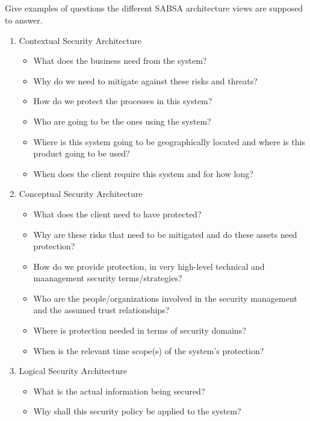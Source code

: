 \begin{questions}
\begin{parts}
  \part{} Give examples of questions the different SABSA architecture views are supposed to answer.
    \begin{solution}
      \begin{enumerate}[noitemsep]
      \item Contextual Security Architecture
        \begin{itemize}[noitemsep]
        \item What does the business need from the system?
        \item Why do we need to mitigate against these risks and threats?
        \item How do we protect the processes in this system?
        \item Who are going to be the ones using the system?
        \item Where is this system going to be geographically located and where is this product going to be used?
        \item When does the client require this system and for how long?
        \end{itemize}
      \item Conceptual Security Architecture
        \begin{itemize}[noitemsep]
        \item What does the client need to have protected?
        \item Why are these risks that need to be mitigated and do these assets need protection?
        \item How do we provide protection, in very high-level technical and maanagement security terms/strategies?
        \item Who are the people/organizations involved in the security management and the assumed trust relationships?
        \item Where is protection needed in terms of security domains?
        \item When is the relevant time scope(s) of the system's protection?
        \end{itemize}
      \item Logical Security Architecture
        \begin{itemize}[noitemsep]
        \item What is the actual information being secured?
        \item Why shall this security policy be applied to the system?

\end{itemize}
\end{enumerate}
\end{solution}
\end{parts}
\end{questions}
